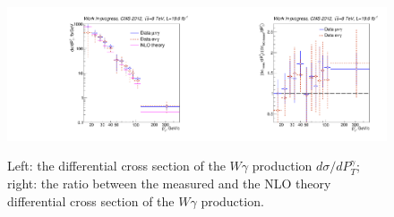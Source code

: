 \begin{figure}[htb]
  \begin{center}
   \includegraphics[width=0.5\textwidth]{../figs/figs_v11/ChannelsMERGED_WGamma/CrossSection/compareCSWGamma.pdf}\includegraphics[width=0.5\textwidth]{../figs/figs_v11/ChannelsMERGED_WGamma/CrossSection/compareCSratioTheoryWGamma.pdf}
  \caption{Left: the differential cross section of the $W\gamma$ production $d\sigma/dP_T^{\gamma}$; right: the ratio between the measured and the NLO theory differential cross section of the $W\gamma$ production. }
  \label{fig:CS_Wg}
 \end{center}
\end{figure}
